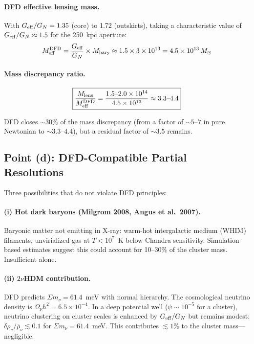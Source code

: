 \documentclass[11pt,a4paper]{article}
\newcommand{\Geff}{G_{\rm eff}}
\begin{document}
\paragraph{DFD effective lensing mass.}
With $\Geff/G_N = 1.35$ (core) to 1.72 (outskirts), taking a characteristic
value of $\Geff/G_N \approx 1.5$ for the 250~kpc aperture:
\begin{equation}
M_{\rm eff}^{\rm DFD} = \frac{\Geff}{G_N} \times M_{\rm bary} \approx 1.5 \times
3 \times 10^{13} = 4.5 \times 10^{13}\,M_\odot
\end{equation}

\paragraph{Mass discrepancy ratio.}
\begin{equation}
\boxed{
\frac{M_{\rm lens}}{M_{\rm eff}^{\rm DFD}} = \frac{1.5\text{--}2.0 \times 10^{14}}
{4.5 \times 10^{13}} \approx 3.3\text{--}4.4
}
\end{equation}

DFD closes $\sim 30\%$ of the mass discrepancy (from a factor of $\sim 5$--$7$
in pure Newtonian to $\sim 3.3$--$4.4$), but a residual factor of $\sim 3.5$
remains.

\subsection{Point (d): DFD-Compatible Partial Resolutions}

Three possibilities that do not violate DFD principles:

\paragraph{(i) Hot dark baryons (Milgrom 2008, Angus et al.\ 2007).}
Baryonic matter not emitting in X-ray: warm-hot intergalactic medium (WHIM)
filaments, unvirialized gas at $T < 10^7$~K below Chandra sensitivity.
Simulation-based estimates suggest this could account for 10--30\% of
the cluster mass.  Insufficient alone.

\paragraph{(ii) $2\nu$HDM contribution.}
DFD predicts $\Sigma m_\nu = 61.4$~meV with normal hierarchy.  The cosmological
neutrino density is $\Omega_\nu h^2 = 6.5 \times 10^{-4}$.  In a deep potential
well ($\psi \sim 10^{-5}$ for a cluster), neutrino clustering on cluster
scales is enhanced by $\Geff/G_N$ but remains modest:
$\delta\rho_\nu/\bar{\rho}_\nu \lesssim 0.1$ for $\Sigma m_\nu = 61.4$~meV.
This contributes $\lesssim 1\%$ to the cluster mass---negligible.
\end{document}
